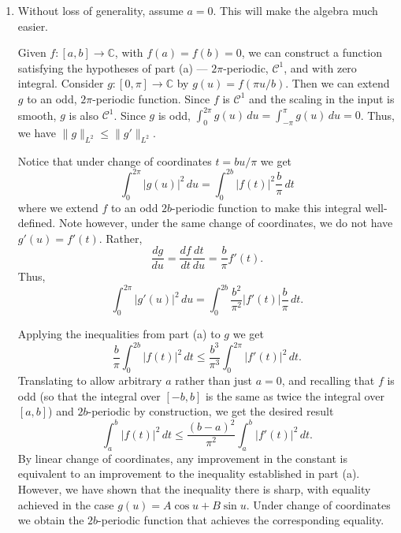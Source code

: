 \documentclass[12 pt, letterpaper]{hmcpset}
\begin{document}
\begin{solution}
\begin{enumerate}
		\item Without loss of generality, assume $a = 0$. This will make the algebra much easier.

			Given $f : [a, b] \to \mathbb{C}$, with $f(a) = f(b) = 0$, we can construct a function satisfying the hypotheses of part (a) --- $2 \pi$-periodic, $\mathcal{C}^{1}$, and with zero integral. Consider $g : [0, \pi] \to \mathbb{C}$ by $g(u) = f(\pi u / b)$. Then we can extend $g$ to an odd, $2 \pi$-periodic function. Since $f$ is $\mathcal{C}^{1}$ and the scaling in the input is smooth, $g$ is also $\mathcal{C}^{1}$. Since $g$ is odd, $\int_{0}^{2 \pi} g(u) \, du = \int_{-\pi}^{\pi} g(u) \, du = 0$. Thus, we have $\lVert g \rVert_{L^{2}} \le \lVert g' \rVert_{L^{2}}$.

			Notice that under change of coordinates $t = b u/ \pi$ we get
			\[
				\int_{0}^{2 \pi} \lvert g(u) \rvert^{2} \, du = \int_{0}^{2 b} \lvert f(t) \rvert^{2} \frac{b}{\pi} \, dt
			\]
			where we extend $f$ to an odd $2b$-periodic function to make this integral well-defined. Note however, under the same change of coordinates, we do not have $g'(u) = f'(t)$. Rather,
			\[
				\frac{dg}{du} = \frac{df}{dt} \frac{dt}{du} = \frac{b}{\pi} f'(t).
			\]
			Thus,
			\[
				\int_{0}^{2 \pi} \lvert g'(u) \rvert^{2} \, du = \int_{0}^{2 b} \frac{b^{2}}{\pi^{2}} \lvert f'(t) \rvert \frac{b}{\pi} \, dt.
			\]

			Applying the inequalities from part (a) to $g$ we get
			\[
				\frac{b}{\pi} \int_{0}^{2 b} \lvert f(t) \rvert^{2} \, dt \le \frac{b^{3}}{\pi^{3}} \int_{0}^{2 \pi} \lvert f'(t) \rvert^{2} \, dt.
			\]
			Translating to allow arbitrary $a$ rather than just $a = 0$, and recalling that $f$ is odd (so that the integral over $[-b, b]$ is the same as twice the integral over $[a, b]$) and $2b$-periodic by construction, we get the desired result
			\[
				\int_{a}^{b} \lvert f(t) \rvert^{2} \, dt \le \frac{(b - a)^{2}}{\pi^{2}} \int_{a}^{b} \lvert f'(t) \rvert^{2} \, dt.
			\]
			By linear change of coordinates, any improvement in the constant is equivalent to an improvement to the inequality established in part (a). However, we have shown that the inequality there is sharp, with equality achieved in the case $g(u) = A \cos{u} + B \sin{u}$. Under change of coordinates we obtain the $2b$-periodic function that achieves the corresponding equality.
	\end{enumerate}
\end{solution}
\end{document}
